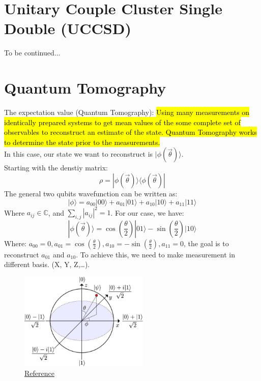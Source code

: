 \documentclass{article}
\begin{document}
\section{Unitary Couple Cluster Single Double (UCCSD)}
To be continued...
\section{Quantum Tomography}
The expectation value (Quantum Tomography):
\hl{Using many measurements on identically prepared systems to get mean values of the some complete set of observables to reconstruct an estimate of the state. Quantum Tomography works to
	determine the state prior to the measurements.}\\

In this case, our state we want to reconstruct is \(|\phi(\vec{\theta})\rangle\).
\\
Starting with the denstiy matrix:
\begin{equation*}
	\rho = |\phi(\vec{\theta})\rangle \langle \phi(\vec{\theta})|
\end{equation*}
The general two qubits wavefunction can be written as:
\begin{equation*}
	| \phi \rangle = a_{00} |00\rangle + a_{01} |01\rangle + a_{10} |10\rangle + a_{11} |11\rangle
\end{equation*}
Where \(a_{ij} \in \mathbb{C}\), and \(\sum_{i,j} |a_{ij}|^2 = 1\). For our case, we have:
\begin{equation*}
	| \phi(\vec{\theta}) \rangle = \cos\left(\frac{\theta}{2}\right) |01\rangle - \sin\left(\frac{\theta}{2}\right) |10\rangle
\end{equation*}
Where: \(a_{00} = 0, a_{01} =\cos\left(\frac{\theta}{2}\right) , a_{10} = -\sin\left(\frac{\theta}{2}\right), a_{11} = 0 \), the goal is to reconstruct
\(a_{01}\) and \(a_{10}\). To achieve this, we need to make measurement in different basis. (X, Y, Z,\dots).
\\
\begin{figure}[H]
	\centering
	\includegraphics[width=0.55\textwidth, height=0.4\textheight]{The-Bloch-sphere-representation-of-a-qubit-The-basis-states-are-located-at-the-north-and_W640.jpg}
	\caption{\href{https://www.researchgate.net/publication/284259345_Quantum_optics_with_artificial_atoms/figures?lo=1}{Reference}}
\end{figure}
\end{document}

